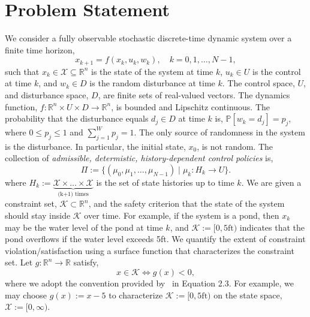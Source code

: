 \documentclass[letterpaper, 10 pt, conference]{ieeeconf}  %
\begin{document}

\section{Problem Statement}
\label{sec::problem}
We consider a fully observable stochastic discrete-time dynamic system over a finite time horizon,\footnotemark
{}
\begin{equation}
x_{k+1} = f(x_k,u_k,w_k), \quad k = 0, 1, \dots, N-1,
\label{sys}
\end{equation}
such that $x_k \in \mathcal{X} \subseteq \mathbb{R}^n$ is the state of the system at time $k$,
$u_k \in U$ is the control at time $k$, and
$w_k \in D$ is the random disturbance at time $k$. The control space, $U$, and disturbance space, $D$, are finite sets of real-valued vectors.
The dynamics function, $f : \mathbb{R}^n \times U \times D \rightarrow \mathbb{R}^n$, is bounded and Lipschitz continuous.
The probability that the disturbance equals $d_j \in D$ at time $k$ is, $\mathbb{P}[w_k = d_j] = p_j$, 
where $0 \leq p_j \leq 1$ and $\sum_{j=1}^W p_j = 1$.\footnotemark
{}  
The only source of randomness in the system is the disturbance.
In particular, the initial state, $x_0$, is not random. 
The collection of \textit{admissible, determistic, history-dependent control policies} is,
%
\begin{equation}
\Pi := \big\{ (\mu_0, \mu_1, \dots, \mu_{N-1}) \mid \mu_k: H_k \rightarrow U \big\}.
\label{pi}
\end{equation}
%
where $H_k := \underbrace{\mathcal{X} \times \hdots \times \mathcal{X}}_{\text{(k+1) times}}$ is the set of state histories up to time $k$.
We are given a constraint set, $\mathcal{K} \subset \mathbb{R}^n$, and the safety criterion that 
the state of the system should stay inside $\mathcal{K}$ over time. 
For example, if the system is a pond, then $x_k$ may be the water level of the pond at time $k$,
and $\mathcal{K} := [0, 5\text{ft})$ indicates that the pond overflows if the water level exceeds 5ft.
We quantify the extent of constraint violation/satisfaction using a surface function that characterizes the constraint set.
Let $g: \mathbb{R}^n \rightarrow \mathbb{R}$ satisfy,
%
\begin{equation}
x \in \mathcal{K} \iff g(x) < 0,
\label{g}
\end{equation}
%
where we adopt the convention provided by~\cite{EECS-2018-41} in Equation 2.3.
For example, we may choose $g(x) := x - 5$ to characterize $\mathcal{K} := [0, 5\text{ft})$ on the state space, 
$\mathcal{X} := [0, \infty)$.
\end{document}
